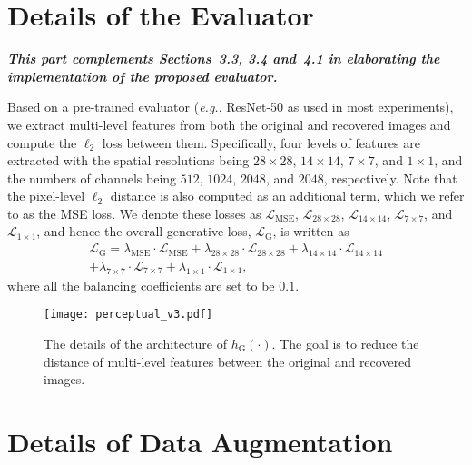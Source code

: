 \documentclass[10pt,twocolumn,letterpaper]{article}
\begin{document}
{\small


}

\newpage
\appendix

\section{Details of the Evaluator}

\textbf{\textit{This part complements Sections~3.3, 3.4 and~4.1 in elaborating the implementation of the proposed evaluator.}}

Based on a pre-trained evaluator (\textit{e.g.}, ResNet-50 as used in most experiments), we extract multi-level features from both the original and recovered images and compute the $\ell_2$ loss between them. Specifically, four levels of features are extracted with the spatial resolutions being $28\times28$, $14\times14$, $7\times7$, and $1\times1$, and the numbers of channels being $512$, $1024$, $2048$, and $2048$, respectively. Note that the pixel-level $\ell_2$ distance is also computed as an additional term, which we refer to as the MSE loss. We denote these losses as $\mathcal{L}_\mathrm{MSE}$, $\mathcal{L}_{28\times28}$, $\mathcal{L}_{14\times14}$, $\mathcal{L}_{7\times7}$, and $\mathcal{L}_{1\times1}$, and hence the overall generative loss, $\mathcal{L}_\mathrm{G}$, is written as
\begin{eqnarray}
\nonumber
\mathcal{L}_\mathrm{G}=\lambda_\mathrm{MSE}\cdot\mathcal{L}_\mathrm{MSE}+\lambda_\mathrm{28\times28}\cdot\mathcal{L}_\mathrm{28\times28}+\lambda_\mathrm{14\times14}\cdot\mathcal{L}_\mathrm{14\times14}\\
+\lambda_\mathrm{7\times7}\cdot\mathcal{L}_\mathrm{7\times7}+\lambda_\mathrm{1\times1}\cdot\mathcal{L}_\mathrm{1\times1},
\end{eqnarray}
where all the balancing coefficients are set to be $0.1$.



\setcounter{figure}{3}
\begin{figure}
\centering
\texttt{[image: perceptual\_v3.pdf]}
\caption{The details of the architecture of $h_\mathrm{G}(\cdot)$. The goal is to reduce the distance of multi-level features between the original and recovered images.}
\label{fig:perceptual}
\end{figure}

\section{Details of Data Augmentation}
\end{document}
